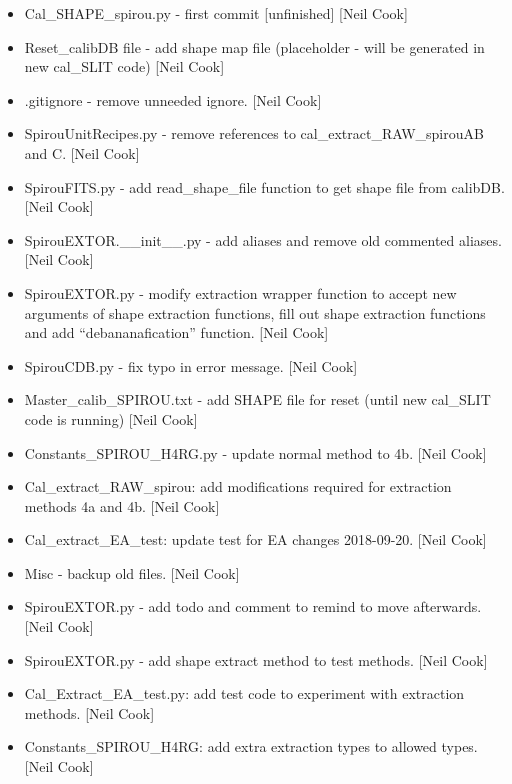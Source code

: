 \documentclass[a4paper,10pt,english]{report}
\begin{document}
\begin{itemize}
\item {} 
Cal\_SHAPE\_spirou.py - first commit {[}unfinished{]} {[}Neil Cook{]}

\item {} 
Reset\_calibDB file - add shape map file (placeholder - will be
generated in new cal\_SLIT code) {[}Neil Cook{]}

\item {} 
.gitignore - remove unneeded ignore. {[}Neil Cook{]}

\item {} 
SpirouUnitRecipes.py - remove references to cal\_extract\_RAW\_spirouAB
and C. {[}Neil Cook{]}

\item {} 
SpirouFITS.py - add read\_shape\_file function to get shape file from
calibDB. {[}Neil Cook{]}

\item {} 
SpirouEXTOR.\_\_init\_\_.py - add aliases and remove old commented
aliases. {[}Neil Cook{]}

\item {} 
SpirouEXTOR.py - modify extraction wrapper function to accept new
arguments of shape extraction functions, fill out shape extraction
functions and add “debananafication” function. {[}Neil Cook{]}

\item {} 
SpirouCDB.py - fix typo in error message. {[}Neil Cook{]}

\item {} 
Master\_calib\_SPIROU.txt - add SHAPE file for reset (until new cal\_SLIT
code is running) {[}Neil Cook{]}

\item {} 
Constants\_SPIROU\_H4RG.py - update normal method to 4b. {[}Neil Cook{]}

\item {} 
Cal\_extract\_RAW\_spirou: add modifications required for extraction
methods 4a and 4b. {[}Neil Cook{]}

\item {} 
Cal\_extract\_EA\_test: update test for EA changes 2018-09-20. {[}Neil
Cook{]}

\item {} 
Misc - backup old files. {[}Neil Cook{]}

\item {} 
SpirouEXTOR.py - add todo and comment to remind to move afterwards.
{[}Neil Cook{]}

\item {} 
SpirouEXTOR.py - add shape extract method to test methods. {[}Neil Cook{]}

\item {} 
Cal\_Extract\_EA\_test.py: add test code to experiment with extraction
methods. {[}Neil Cook{]}

\item {} 
Constants\_SPIROU\_H4RG: add extra extraction types to allowed types.
{[}Neil Cook{]}

\end{itemize}
\end{document}
